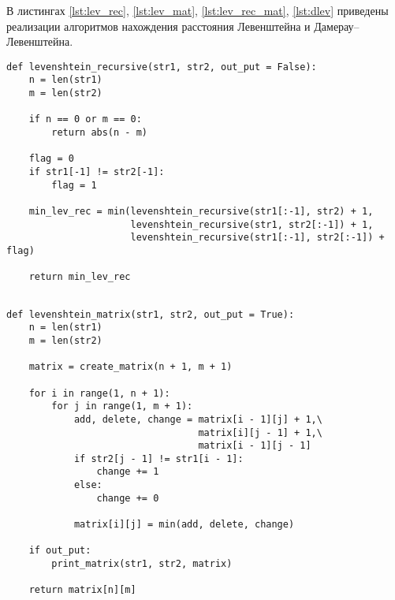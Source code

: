  В листингах \ref{lst:lev_rec}, \ref{lst:lev_mat}, \ref{lst:lev_rec_mat}, \ref{lst:dlev} приведены реализации алгоритмов нахождения расстояния Левенштейна и Дамерау--Левенштейна.

\begin{lstlisting}[label=lst:lev_rec,caption=Функция нахождения расстояния Левенштейна с использованием рекурсии.]
def levenshtein_recursive(str1, str2, out_put = False):
	n = len(str1)
	m = len(str2)
	
	if n == 0 or m == 0:
		return abs(n - m)
	
	flag = 0
	if str1[-1] != str2[-1]:
		flag = 1
	
	min_lev_rec = min(levenshtein_recursive(str1[:-1], str2) + 1,
					  levenshtein_recursive(str1, str2[:-1]) + 1,
					  levenshtein_recursive(str1[:-1], str2[:-1]) + flag)
	
	return min_lev_rec
	
\end{lstlisting}

\begin{lstlisting}[label=lst:lev_mat,caption=Функция нахождения расстояния Левенштейна с использованием рекурсии.]
def levenshtein_matrix(str1, str2, out_put = True):
	n = len(str1)
	m = len(str2)
	
	matrix = create_matrix(n + 1, m + 1)
	
	for i in range(1, n + 1):
		for j in range(1, m + 1):
			add, delete, change = matrix[i - 1][j] + 1,\
								  matrix[i][j - 1] + 1,\
						    	  matrix[i - 1][j - 1]
			if str2[j - 1] != str1[i - 1]:
				change += 1
			else:
				change += 0
			
			matrix[i][j] = min(add, delete, change)
	
	if out_put:
		print_matrix(str1, str2, matrix)
	
	return matrix[n][m]
	
\end{lstlisting}

